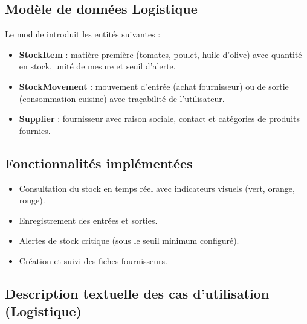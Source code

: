 \subsection{Modèle de données Logistique}

Le module introduit les entités suivantes :
\begin{itemize}
    \item \textbf{StockItem} : matière première (tomates, poulet, huile d'olive) avec quantité en stock, unité de mesure et seuil d'alerte.
    \item \textbf{StockMovement} : mouvement d'entrée (achat fournisseur) ou de sortie (consommation cuisine) avec traçabilité de l'utilisateur.
    \item \textbf{Supplier} : fournisseur avec raison sociale, contact et catégories de produits fournies.
\end{itemize}

\subsection{Fonctionnalités implémentées}

\begin{itemize}
    \item Consultation du stock en temps réel avec indicateurs visuels (vert, orange, rouge).
    \item Enregistrement des entrées et sorties.
    \item Alertes de stock critique (sous le seuil minimum configuré).
    \item Création et suivi des fiches fournisseurs.
\end{itemize}

\subsection{Description textuelle des cas d'utilisation (Logistique)}


